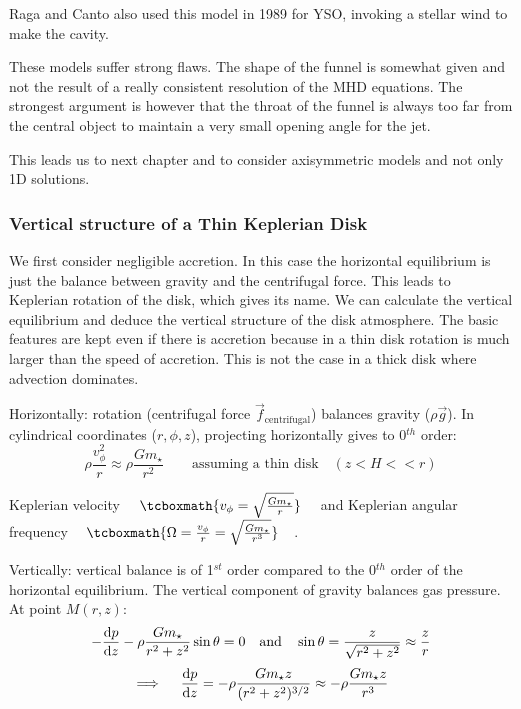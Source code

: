\documentclass[10pt,a4paper,english]{article}
\begin{document}

Raga and Canto also used this model in 1989 for YSO, invoking a stellar wind to
make the cavity.


These models suffer strong flaws. The shape of the funnel is somewhat given and
not the result of a really consistent resolution of the MHD equations. The
strongest argument is however that the throat of the funnel is always too far
from the central object to maintain a very small opening angle for the jet.

This leads us to next chapter and to consider axisymmetric models and not only
1D solutions.

\subsubsection{Vertical structure of a Thin Keplerian Disk}
We first consider negligible accretion. In this case the horizontal equilibrium is just the balance between gravity and the centrifugal force. This leads to Keplerian rotation of the disk, which gives its name. We can calculate the vertical equilibrium and deduce the vertical structure of the disk atmosphere. The basic features are kept even if there is accretion because in a thin disk rotation is much larger than the speed of accretion. This is not the case in a thick disk where advection dominates.


Horizontally: rotation (centrifugal force $\vec{f}_{\text{centrifugal}}$) balances gravity ($\rho \vec{g}$). In cylindrical coordinates ($r, \phi, z$), projecting horizontally gives to 0$^{th}$ order:
\begin{equation}
	\rho \frac{v_\phi^2}{r}\approx \rho\frac{Gm_\star}{r^2} \qquad \text{assuming a thin disk} \quad (z<H<<r)
\end{equation}

Keplerian velocity $\quad\tcboxmath{v_\phi = \sqrt{\frac{Gm_\star}{r}}} \quad$ and Keplerian angular frequency $\quad\tcboxmath{\Omega = \frac{v_\phi}{r} = \sqrt{\frac{Gm_\star}{r^3}}} \quad$.

Vertically: vertical balance is of 1$^{st}$ order compared to the 0$^{th}$ order of the horizontal equilibrium. The vertical component of gravity balances gas pressure. At point $M(r,z)$:
\begin{equation}
-\frac{\mathrm{d} p}{\mathrm{d} z}-\rho \frac{Gm_\star}{r^2+z^2}\sin\theta = 0 \quad \text{and} \quad \sin\theta = \frac{z}{\sqrt{r^2+z^2}} \approx \frac{z}{r}
\end{equation}
\begin{equation}
\implies \quad \frac{\mathrm{d} p}{\mathrm{d} z} = -\rho \frac{G m_\star z}{(r^2+z^2)^{3/2}} \approx -\rho \frac{G m_\star z}{r^3}
\end{equation}
\end{document}
